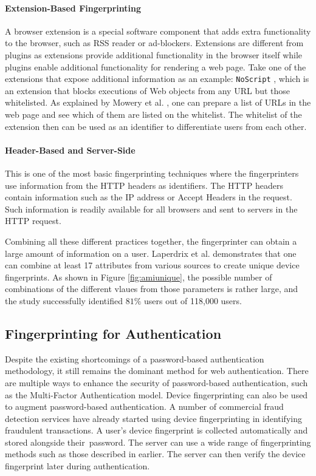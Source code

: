 \documentclass{acm_proc_article-sp}
\begin{document}
\paragraph{Extension-Based Fingerprinting}
A browser extension is a special software component that adds extra functionality to the browser, such as RSS reader or ad-blockers. Extensions are different from plugins as extensions provide additional functionality in the browser itself while plugins enable additional functionality for rendering a web page. Take one of the extensions  that expose additional
information as an example: \verb|NoScript| \cite{noscript}, which is an extension that blocks executions of Web objects from any URL but those whitelisted. As explained by Mowery et al. \cite{mowery:fg}, one can prepare a list of URLs in the web page and see which of them are listed on the whitelist. The whitelist of the extension then can be used as an identifier to differentiate users from each other.

\paragraph{Header-Based and Server-Side}
This is one of the most basic fingerprinting techniques where the fingerprinters use information from the HTTP headers as identifiers. The HTTP headers contain information such as the IP address or Accept Headers in the request. Such information is readily available for all browsers and sent to  servers in the HTTP request.

Combining all these different practices together, the fingerprinter can obtain a large amount of information on a user.  Laperdrix et al. \cite{pierre:beauty} demonstrates that one can combine at least 17 attributes from various sources to create unique device fingerprints. As shown in Figure \ref{fig:amiunique}, the possible number of combinations of the different vlaues from those parameters is rather large, and the study successfully identified $81\%$ users out of 118,000 users.



\subsection{Fingerprinting for Authentication}
Despite the existing shortcomings of a password-based authentication methodology, it still remains the dominant method for web authentication. There are multiple ways to enhance the security of password-based authentication, such as the Multi-Factor Authentication model. Device fingerprinting can also be used to augment password-based authentication.
A number of commercial fraud detection services have already started using device fingerprinting in identifying fraudulent transactions.\cite{maxmind} \cite{parame} A user's device fingerprint is collected automatically and stored alongside their\ password.  The server can use a wide range of fingerprinting methods such as those described in earlier. The server can then verify the device fingerprint later during authentication.
\end{document}
